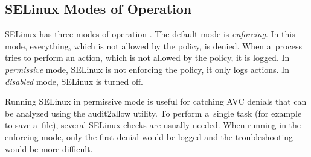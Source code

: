 \subsection{SELinux Modes of Operation}

SELinux has three modes of operation \cite{selinuxguide}. The default mode is
\emph{enforcing}. In this mode, everything, which is not allowed by the policy,
is denied. When a~process tries to perform an action, which is not allowed by
the policy, it is logged. In \emph{permissive} mode, SELinux is not enforcing
the policy, it only logs actions. In \emph{disabled} mode, SELinux is turned
off.

Running SELinux in permissive mode is useful for catching AVC denials that can
be analyzed using the audit2allow utility. To perform a~single task (for example
to save a~file), several SELinux checks are usually needed. When running in the
enforcing mode, only the first denial would be logged and the troubleshooting
would be more difficult.

